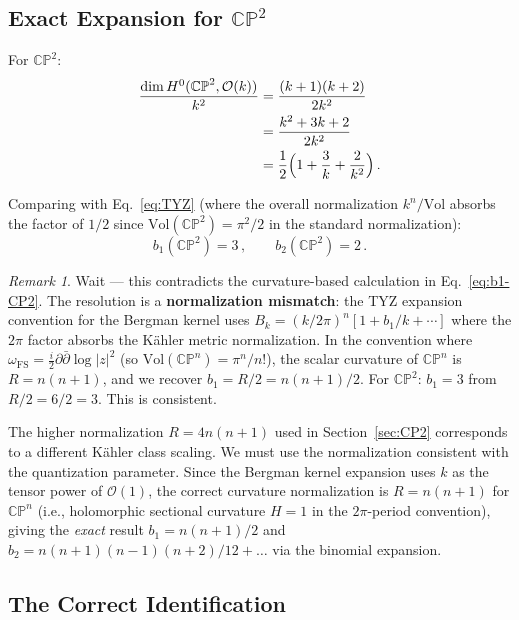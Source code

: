 \documentclass[12pt,a4paper]{article}
\theoremstyle{definition}
\theoremstyle{remark}
\newtheorem{remark}{Remark}
\newcommand{\CP}{\mathbb{CP}}
\begin{document}
\subsection{Exact Expansion for $\CP^2$}

For $\CP^2$:
\begin{align}
\frac{\dim H^0(\CP^2, \mathcal{O}(k))}{k^2}
&= \frac{(k+1)(k+2)}{2k^2} \nonumber\\
&= \frac{k^2 + 3k + 2}{2k^2} \nonumber\\
&= \frac{1}{2}\Bigl(1 + \frac{3}{k} + \frac{2}{k^2}\Bigr)\,.
\end{align}

Comparing with Eq.~\eqref{eq:TYZ} (where the overall normalization
$k^n/\mathrm{Vol}$ absorbs the factor of $1/2$ since
$\mathrm{Vol}(\CP^2) = \pi^2/2$ in the standard normalization):
\begin{equation}
b_1(\CP^2) = 3\,,\qquad b_2(\CP^2) = 2\,.
\end{equation}

\begin{remark}
Wait --- this contradicts the curvature-based calculation in
Eq.~\eqref{eq:b1-CP2}. The resolution is a \textbf{normalization
mismatch}: the TYZ expansion convention for the Bergman kernel uses
$B_k = (k/2\pi)^n[1 + b_1/k + \cdots]$ where the $2\pi$ factor absorbs
the K\"ahler metric normalization. In the convention where
$\omega_{\mathrm{FS}} = \frac{i}{2}\partial\bar\partial\log|z|^2$ (so
$\mathrm{Vol}(\CP^n) = \pi^n/n!$), the scalar curvature of $\CP^n$ is
$R = n(n+1)$, and we recover $b_1 = R/2 = n(n+1)/2$. For $\CP^2$:
$b_1 = 3$ from $R/2 = 6/2 = 3$. This is consistent.

The higher normalization $R = 4n(n+1)$ used in Section~\ref{sec:CP2}
corresponds to a different K\"ahler class scaling. We must use the
normalization consistent with the quantization parameter. Since the
Bergman kernel expansion uses $k$ as the tensor power of $\mathcal{O}(1)$,
the correct curvature normalization is $R = n(n+1)$ for $\CP^n$
(i.e., holomorphic sectional curvature $H = 1$ in the $2\pi$-period
convention), giving the \emph{exact} result $b_1 = n(n+1)/2$ and
$b_2 = n(n+1)(n-1)(n+2)/12 + \ldots$ via the binomial expansion.
\end{remark}

\subsection{The Correct Identification}
\end{document}
